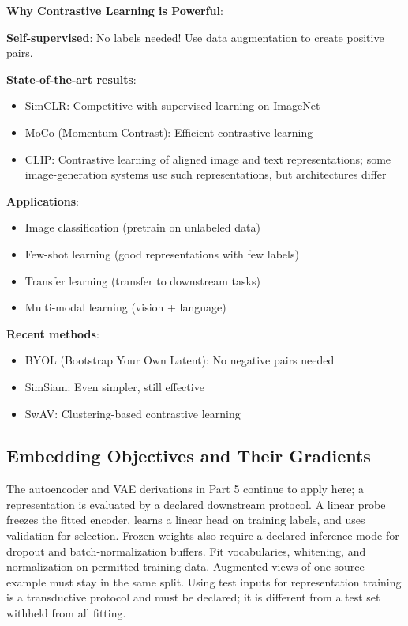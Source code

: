 \documentclass[11pt,twoside]{article}
\numberwithin{equation}{section}
\theoremstyle{plain}
\theoremstyle{definition}
\theoremstyle{remark}
\newenvironment{keyidea}{
  \begin{tcolorbox}[colback=yellow!5!white,
                    colframe=yellow!50!black,
                    title=Key Idea,
                    breakable,
                    enhanced,
                    sharp corners,
                    boxrule=0.8pt,
                    left=6pt, right=6pt, top=6pt, bottom=6pt]
}{
  \end{tcolorbox}
}
\begin{document}
\begin{keyidea}
\textbf{Why Contrastive Learning is Powerful}:

\textbf{Self-supervised}: No labels needed! Use data augmentation to create positive pairs.

\textbf{State-of-the-art results}:
\begin{itemize}
\item SimCLR: Competitive with supervised learning on ImageNet
\item MoCo (Momentum Contrast): Efficient contrastive learning
\item CLIP: Contrastive learning of aligned image and text representations; some image-generation systems use such representations, but architectures differ
\end{itemize}

\textbf{Applications}:
\begin{itemize}
\item Image classification (pretrain on unlabeled data)
\item Few-shot learning (good representations with few labels)
\item Transfer learning (transfer to downstream tasks)
\item Multi-modal learning (vision + language)
\end{itemize}

\textbf{Recent methods}:
\begin{itemize}
\item BYOL (Bootstrap Your Own Latent): No negative pairs needed
\item SimSiam: Even simpler, still effective
\item SwAV: Clustering-based contrastive learning
\end{itemize}
\end{keyidea}

\subsection{Embedding Objectives and Their Gradients}
\label{sec:embeddings-worked}
The autoencoder and VAE derivations in Part 5 continue to apply here; a
representation is evaluated by a declared downstream protocol. A linear probe
freezes the fitted encoder, learns a linear head on training labels, and uses
validation for selection. Frozen weights also require a declared inference
mode for dropout and batch-normalization buffers. Fit vocabularies, whitening,
and normalization on permitted training data. Augmented views of one source
example must stay in the same split. Using test inputs for representation
training is a transductive protocol and must be declared; it is different
from a test set withheld from all fitting.
\end{document}
